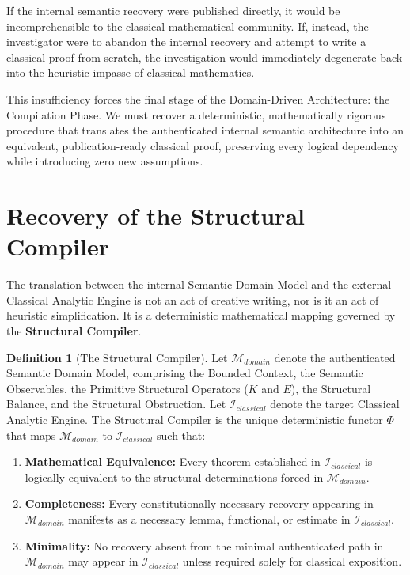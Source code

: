 \documentclass[12pt,openany]{extbook}
\theoremstyle{plain}
\theoremstyle{definition}
\newtheorem{definition}{Definition}[chapter]
\begin{document}
If the internal semantic recovery were published directly, it would be incomprehensible to the classical mathematical community. If, instead, the investigator were to abandon the internal recovery and attempt to write a classical proof from scratch, the investigation would immediately degenerate back into the heuristic impasse of classical mathematics.

This insufficiency forces the final stage of the Domain-Driven Architecture: the Compilation Phase. We must recover a deterministic, mathematically rigorous procedure that translates the authenticated internal semantic architecture into an equivalent, publication-ready classical proof, preserving every logical dependency while introducing zero new assumptions.

\section{Recovery of the Structural Compiler}

The translation between the internal Semantic Domain Model and the external Classical Analytic Engine is not an act of creative writing, nor is it an act of heuristic simplification. It is a deterministic mathematical mapping governed by the \textbf{Structural Compiler}.

\begin{definition}[The Structural Compiler]
Let $\mathcal{M}_{domain}$ denote the authenticated Semantic Domain Model, comprising the Bounded Context, the Semantic Observables, the Primitive Structural Operators ($K$ and $E$), the Structural Balance, and the Structural Obstruction. Let $\mathcal{I}_{classical}$ denote the target Classical Analytic Engine. The Structural Compiler is the unique deterministic functor $\Phi$ that maps $\mathcal{M}_{domain}$ to $\mathcal{I}_{classical}$ such that:
\begin{enumerate}
    \item \textbf{Mathematical Equivalence:} Every theorem established in $\mathcal{I}_{classical}$ is logically equivalent to the structural determinations forced in $\mathcal{M}_{domain}$.
    \item \textbf{Completeness:} Every constitutionally necessary recovery appearing in $\mathcal{M}_{domain}$ manifests as a necessary lemma, functional, or estimate in $\mathcal{I}_{classical}$.
    \item \textbf{Minimality:} No recovery absent from the minimal authenticated path in $\mathcal{M}_{domain}$ may appear in $\mathcal{I}_{classical}$ unless required solely for classical exposition.
\end{enumerate}
\end{definition}
\end{document}
